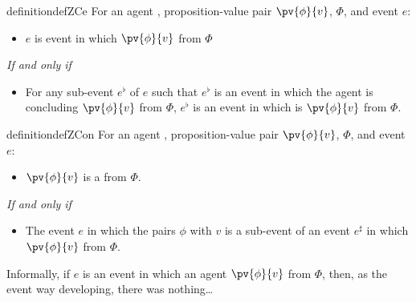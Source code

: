 \begin{note}
    \begin{restatable}[\sCe{2}]{definition}{defZCe}
    \label{def:sCe}
    For an agent \vAgent{}, proposition-value pair \(\pv{\phi}{v}\), \poP{} \(\Phi\), and event \(e\):

    \begin{itemize}
    \item
      \(e\) is event in which \vAgent{} \emph{\sCe{}} \(\pv{\phi}{v}\) from \(\Phi\)
    \end{itemize}

    \emph{If and only if}

    \begin{itemize}
    \item
      For any sub-event \(e^{\flat}\) of \(e\) such that \(e^{\flat}\) is an event in which the agent is concluding \(\pv{\phi}{v}\) from \(\Phi\), \(e^{\flat}\) is an event in which \vAgent{} is \sCing{} \(\pv{\phi}{v}\) from \(\Phi\).
    \end{itemize}
    \vspace{-\baselineskip}
  \end{restatable}

    \begin{restatable}[\sCon{2}]{definition}{defZCon}
    \label{def:sCon}
    For an agent \vAgent{}, proposition-value pair \(\pv{\phi}{v}\), \poP{} \(\Phi\), and event \(e\):

    \begin{itemize}
    \item
      \(\pv{\phi}{v}\) is a \emph{\sCon{}} from \(\Phi\).
    \end{itemize}

    \emph{If and only if}

    \begin{itemize}
    \item
      The event \(e\) in which the \vAgent{} pairs \(\phi\) with \(v\) is a sub-event of an event \(e^{\sharp}\) in which \vAgent{}  \(\pv{\phi}{v}\) from \(\Phi\).
    \end{itemize}
    \vspace{-\baselineskip}
  \end{restatable}
\end{note}

\begin{note}
  Informally, if \(e\) is an event in which an agent \sCe{} \(\pv{\phi}{v}\) from \(\Phi\), then, as the event way developing, there was nothing\dots
\end{note}


